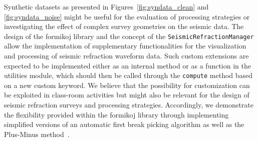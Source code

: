 \documentclass[a4paper,fleqn]{cas-sc}
\begin{document}
Synthetic datasets as presented in Figures~\ref{fig:syndata_clean} and \ref{fig:syndata_noise} might be useful for the evaluation of processing strategies or investigating the effect of complex survey geometries on the seismic data. The design of the formikoj library and the concept of the \texttt{SeismicRefractionManager} allow the implementation of supplementary functionalities for the visualization and processing of seismic refraction waveform data. 
Such custom extensions are expected to be implemented either as an internal method or as a function in the utilities module, which should then be called through the \texttt{compute} method based on a new custom keyword. We believe that the possibility for customization can be exploited in class-room activities but might also be relevant for the design of seismic refraction surveys and processing strategies. Accordingly, we demonstrate the flexibility provided within the formikoj library through implementing simplified versions of an automatic first break picking algorithm as well as the Plus-Minus method~\citep{hagedoorn1959}.
\end{document}
